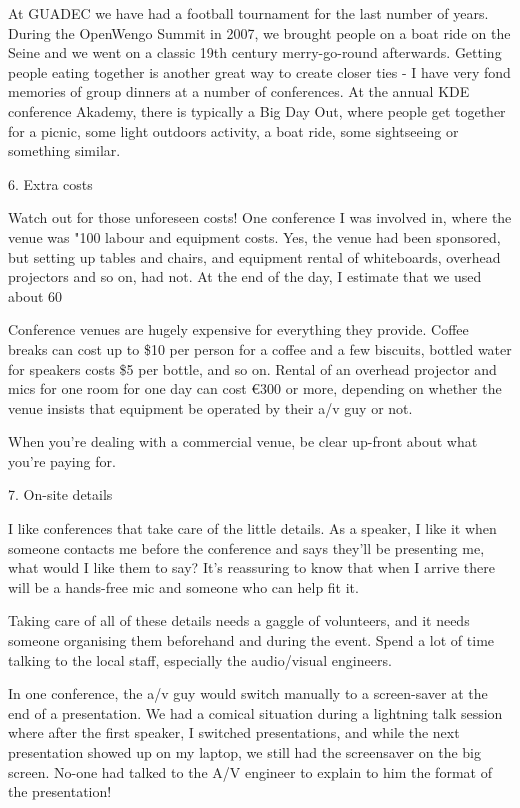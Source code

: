 At GUADEC we have had a football tournament for the last number of
years. During the OpenWengo Summit in 2007, we brought people on a boat
ride on the Seine and we went on a classic 19th century merry-go-round
afterwards. Getting people eating together is another great way to
create closer ties - I have very fond memories of group dinners at a
number of conferences. At the annual KDE conference Akademy, there is
typically a Big Day Out, where people get together for a picnic, some
light outdoors activity, a boat ride, some sightseeing or something similar.

6. Extra costs

Watch out for those unforeseen costs! One conference I was involved in,
where the venue was "100%
labour and equipment costs. Yes, the venue had been sponsored, but
setting up tables and chairs, and equipment rental of whiteboards,
overhead projectors and so on, had not. At the end of the day, I
estimate that we used about 60%

Conference venues are hugely expensive for everything they provide.
Coffee breaks can cost up to \$10 per person for a coffee and a few
biscuits, bottled water for speakers costs \$5 per bottle, and so on.
Rental of an overhead projector and mics for one room for one day can
cost €300 or more, depending on whether the venue insists that equipment
be operated by their a/v guy or not.

When you're dealing with a commercial venue, be clear up-front about
what you're paying for.

7. On-site details

I like conferences that take care of the little details. As a speaker, I
like it when someone contacts me before the conference and says they'll
be presenting me, what would I like them to say? It's reassuring to know
that when I arrive there will be a hands-free mic and someone who can
help fit it.

Taking care of all of these details needs a gaggle of volunteers, and it
needs someone organising them beforehand and during the event. Spend a
lot of time talking to the local staff, especially the audio/visual
engineers.

In one conference, the a/v guy would switch manually to a screen-saver
at the end of a presentation. We had a comical situation during a
lightning talk session where after the first speaker, I switched
presentations, and while the next presentation showed up on my laptop,
we still had the screensaver on the big screen. No-one had talked to the
A/V engineer to explain to him the format of the presentation!

